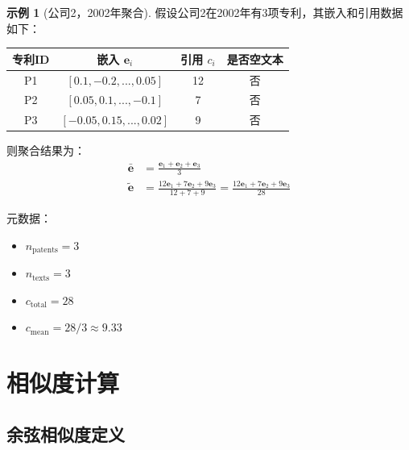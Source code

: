 \documentclass[12pt,a4paper]{article}
\theoremstyle{definition}
\newtheorem{example}{示例}[section]
\newcommand{\vect}[1]{\mathbf{#1}}
\begin{document}
\begin{example}[公司2，2002年聚合]
假设公司2在2002年有3项专利，其嵌入和引用数据如下：

\begin{table}[H]
    \centering
    \begin{tabular}{@{}cccc@{}}
        \toprule
        \textbf{专利ID} & \textbf{嵌入} $\vect{e}_i$ & \textbf{引用} $c_i$ & \textbf{是否空文本} \\
        \midrule
        P1 & $[0.1, -0.2, ..., 0.05]$ & 12 & 否 \\
        P2 & $[0.05, 0.1, ..., -0.1]$ & 7 & 否 \\
        P3 & $[-0.05, 0.15, ..., 0.02]$ & 9 & 否 \\
        \bottomrule
    \end{tabular}
\end{table}

则聚合结果为：
\begin{align}
    \bar{\vect{e}} &= \frac{\vect{e}_1 + \vect{e}_2 + \vect{e}_3}{3} \\
    \tilde{\vect{e}} &= \frac{12\vect{e}_1 + 7\vect{e}_2 + 9\vect{e}_3}{12 + 7 + 9} = \frac{12\vect{e}_1 + 7\vect{e}_2 + 9\vect{e}_3}{28}
\end{align}

元数据：
\begin{itemize}
    \item $n_{\text{patents}} = 3$
    \item $n_{\text{texts}} = 3$
    \item $c_{\text{total}} = 28$
    \item $c_{\text{mean}} = 28/3 \approx 9.33$
\end{itemize}
\end{example}

\section{相似度计算}

\subsection{余弦相似度定义}
\end{document}
